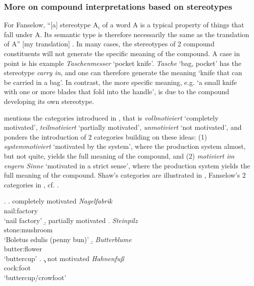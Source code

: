 \subsubsection{More on compound interpretations based on stereotypes}
\label{sec:stereotypes}
For Fanselow, ``[a] stereotype A$_i$ of a word A is a typical property
  of things that fall under A. Its semantic type is
  therefore necessarily the same as the translation of A'' [my
  translation] \citep[169]{Fanselow:1981}. In many cases, the
  stereotypes of 2 compound constituents will not generate the
  specific meaning of the compound. A case in point is his example
  \emph{Taschenmesser} `pocket knife'. \emph{Tasche} `bag, pocket' has
  the stereotype \emph{carry in}, and one can therefore generate the
  meaning `knife that can be carried in a bag'. In contrast, the more
  specific meaning, e.g. `a small knife with one or more blades that
  fold into the handle', is due to the compound developing its own stereotype.

\citet[168]{Fanselow:1981} mentions the categories introduced in \citet{Shaw:1978}, that is
\emph{vollmotiviert} `completely motivated', %
\emph{ teilmotiviert} `partially motivated', %
\emph{unmotiviert} `not motivated', %
and ponders the introduction of 2 categories building on these ideas:
(1) \emph{systemmotiviert}  `motivated by the system',
where the production system almost, but not quite, yields
  the full meaning of the compound, and (2) \emph{motiviert im engern
    Sinne} `motivated in a strict sense', where 
  the production system yields
  the full meaning of the compound. Shaw's categories are illustrated in \Next, Fanselow's 2 categories in \NNext, cf. \citet[168]{Fanselow:1981}.

\enlargethispage{1\baselineskip}
\ex. \a. completely motivated
  \gll \emph{Nagelfabrik}\\
nail:factory\\
  `nail factory'
  \b. partially motivated
  \a. \gll
  \emph{Steinpilz}\\
  stone:mushroom\\
  `Boletus edulis (penny bun)'
  \b. \gll
  \emph{Butterblume}\\
  butter:flower\\
  `buttercup'
\z.
\c. not motivated
\gll
\emph{Hahnenfuß}\\
cock:foot\\
`buttercup/crowfoot'

